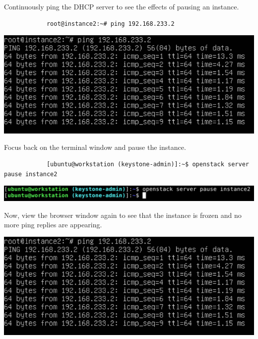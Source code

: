 \documentclass[letterpaper, 12pt]{article}
\begin{document}
\begin{enumerate}
    \begin{labstep}
        Continuously ping the DHCP server to see the effects of pausing an instance.
        \begin{lstlisting}
            root@instance2:~# ping 192.168.233.2
        \end{lstlisting}

        \begin{center}
            \includegraphics[width=\linewidth]{images/part4/step4.png}
        \end{center}
    \end{labstep}

    \begin{labstep}
        Focus back on the terminal window and pause the instance.
        \begin{lstlisting}
            [ubuntu@workstation (keystone-admin)]:~$ openstack server pause instance2
        \end{lstlisting}

        \begin{center}
            \includegraphics[width=\linewidth]{images/part4/step5.png}
        \end{center}
    \end{labstep}

    \begin{labstep}
        Now, view the browser window again to see that the instance is frozen and no more ping replies are appearing.

        \begin{center}
            \includegraphics[width=\linewidth]{images/part4/step6.png}
        \end{center}
    \end{labstep}


\end{enumerate}
\end{document}
